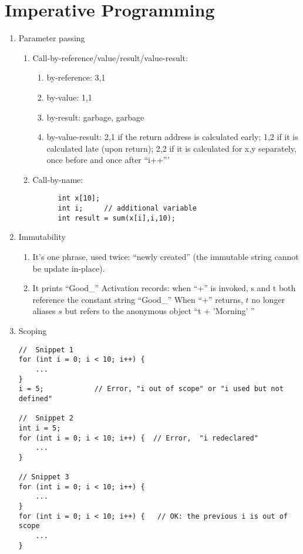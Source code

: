 \documentclass{article}
\begin{document}
\section*{Imperative Programming}
\begin{enumerate}

\item Parameter passing
\begin{enumerate}
  \item Call-by-reference/value/result/value-result:
  \begin{enumerate}
    \item by-reference: 3,1
     \item by-value: 1,1
     \item by-result: garbage, garbage
     \item by-value-result: 2,1 if the return address is calculated early;
          1,2 if it is calculated late (upon return); 
          2,2 if it is calculated for x,y separately, once before and once
          after ``i++'''
   \end{enumerate}
  \item Call-by-name:
     \begin{verbatim}
      int x[10];
      int i;     // additional variable
      int result = sum(x[i],i,10);
      \end{verbatim}
\end{enumerate}
\item Immutability
\begin{enumerate}
  \item It's one phrase, used twice: ``newly created'' (the immutable
        string cannot be update in-place). 
   \item It prints ``Good\_''
         Activation records: when ``+'' is invoked, s and t both reference 
         the constant string ``Good\_'' When ``+'' returns, $t$ no longer
         aliases $s$ but refers to the anonymous object ``t + 'Morning' ''          
   \end{enumerate}


\item Scoping
{\small
\begin{verbatim}
//  Snippet 1
for (int i = 0; i < 10; i++) {
    ...
}
i = 5;            // Error, "i out of scope" or "i used but not defined" 

//  Snippet 2 
int i = 5;
for (int i = 0; i < 10; i++) {  // Error,  "i redeclared"
    ...
}
    
// Snippet 3
for (int i = 0; i < 10; i++) {
    ...
}
for (int i = 0; i < 10; i++) {   // OK: the previous i is out of scope
    ...
}
\end{verbatim}
}
\end{enumerate}
\end{document}
